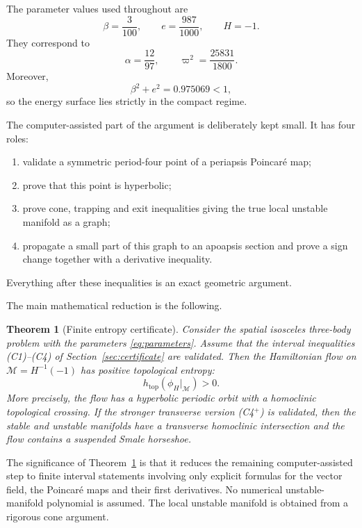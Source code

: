 \documentclass[11pt]{article}
\newtheorem{theorem}{Theorem}[section]
\newcommand{\cM}{\mathcal M}
\newcommand{\htop}{h_{\mathrm{top}}}
\begin{document}
The parameter values used throughout are
\begin{equation}\label{eq:parameters}
 \beta=\frac{3}{100},\qquad
 e=\frac{987}{1000},\qquad
 H=-1.
\end{equation}
They correspond to
\begin{equation}\label{eq:alphaomega}
 \alpha=\frac{12}{97},\qquad
 \varpi^2=\frac{25831}{1800}.
\end{equation}
Moreover,
\[
 \beta^2+e^2=0.975069<1,
\]
so the energy surface lies strictly in the compact regime.

The computer-assisted part of the argument is deliberately kept small.  It
has four roles:
\begin{enumerate}[label=(\roman*)]
\item validate a symmetric period-four point of a periapsis Poincar\'e map;
\item prove that this point is hyperbolic;
\item prove cone, trapping and exit inequalities giving the true local
unstable manifold as a graph;
\item propagate a small part of this graph to an apoapsis section and prove a
sign change together with a derivative inequality.
\end{enumerate}
Everything after these inequalities is an exact geometric argument.

The main mathematical reduction is the following.

\begin{theorem}[Finite entropy certificate]\label{thm:certificate}
Consider the spatial isosceles three-body problem with the parameters
\eqref{eq:parameters}.  Assume that the interval inequalities
\textnormal{(C1)--(C4)} of Section~\ref{sec:certificate} are validated.
Then the Hamiltonian flow on $\cM=H^{-1}(-1)$ has positive topological
entropy:
\[
 \htop(\phi_H|_{\cM})>0.
\]
More precisely, the flow has a hyperbolic periodic orbit with a homoclinic
topological crossing.  If the stronger transverse version
\textnormal{(C4$^+$)} is validated, then the stable and unstable manifolds
have a transverse homoclinic intersection and the flow contains a suspended
Smale horseshoe.
\end{theorem}

The significance of Theorem~\ref{thm:certificate} is that it reduces the
remaining computer-assisted step to finite interval statements involving only explicit formulas for the vector
field, the Poincar\'e maps and their first derivatives.  No numerical
unstable-manifold polynomial is assumed.  The local unstable manifold is
obtained from a rigorous cone argument.
\end{document}
